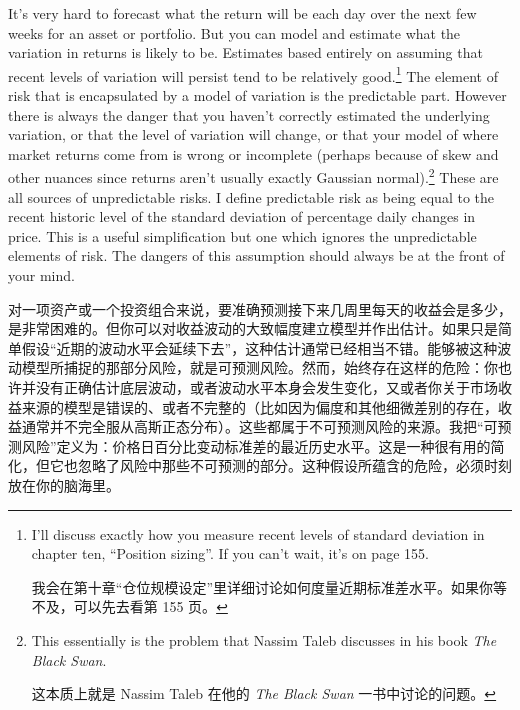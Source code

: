 \begin{englishblock} It's very hard to forecast what the return will be each day over the next few weeks for an asset or portfolio. But you can model and estimate what the variation in returns is likely to be. Estimates based entirely on assuming that recent levels of variation will persist tend to be relatively good.\footnote{I'll discuss exactly how you measure recent levels of standard deviation in chapter ten, ``Position sizing''. If you can't wait, it's on page 155. \par 我会在第十章“仓位规模设定”里详细讨论如何度量近期标准差水平。如果你等不及，可以先去看第 155 页。} The element of risk that is encapsulated by a model of variation is the predictable part. However there is always the danger that you haven't correctly estimated the underlying variation, or that the level of variation will change, or that your model of where market returns come from is wrong or incomplete (perhaps because of skew and other nuances since returns aren't usually exactly Gaussian normal).\footnote{This essentially is the problem that Nassim Taleb discusses in his book \textit{The Black Swan}. \par 这本质上就是 Nassim Taleb 在他的 \textit{The Black Swan} 一书中讨论的问题。} These are all sources of unpredictable risks. I define predictable risk as being equal to the recent historic level of the standard deviation of percentage daily changes in price. This is a useful simplification but one which ignores the unpredictable elements of risk. The dangers of this assumption should always be at the front of your mind. \end{englishblock}

\begin{chineseblock}对一项资产或一个投资组合来说，要准确预测接下来几周里每天的收益会是多少，是非常困难的。但你可以对收益波动的大致幅度建立模型并作出估计。如果只是简单假设“近期的波动水平会延续下去”，这种估计通常已经相当不错。能够被这种波动模型所捕捉的那部分风险，就是可预测风险。然而，始终存在这样的危险：你也许并没有正确估计底层波动，或者波动水平本身会发生变化，又或者你关于市场收益来源的模型是错误的、或者不完整的（比如因为偏度和其他细微差别的存在，收益通常并不完全服从高斯正态分布）。这些都属于不可预测风险的来源。我把“可预测风险”定义为：价格日百分比变动标准差的最近历史水平。这是一种很有用的简化，但它也忽略了风险中那些不可预测的部分。这种假设所蕴含的危险，必须时刻放在你的脑海里。\end{chineseblock}

\bipairgap

